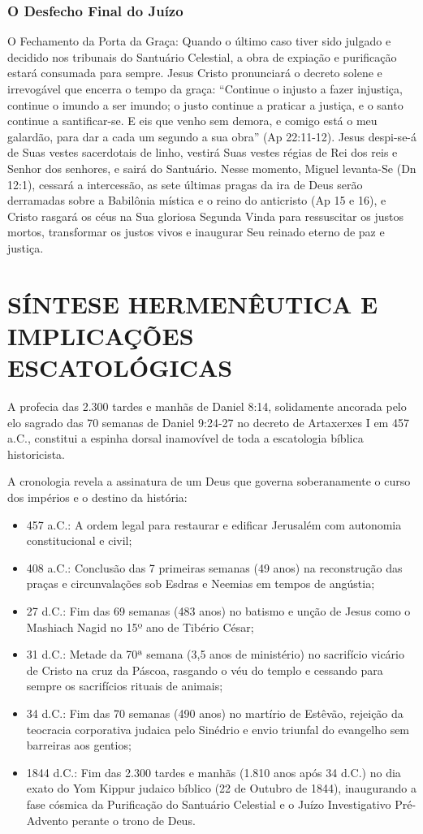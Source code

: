 \documentclass[11pt,a4paper,openany]{book}
\begin{document}
\subsubsection*{O Desfecho Final do Juízo}
O Fechamento da Porta da Graça:
Quando o último caso tiver sido julgado e decidido nos tribunais do Santuário Celestial, a obra de expiação e purificação estará consumada para sempre. Jesus Cristo pronunciará o decreto solene e irrevogável que encerra o tempo da graça:
``Continue o injusto a fazer injustiça, continue o imundo a ser imundo; o justo continue a praticar a justiça, e o santo continue a santificar-se. E eis que venho sem demora, e comigo está o meu galardão, para dar a cada um segundo a sua obra'' (Ap 22:11-12).
Jesus despi-se-á de Suas vestes sacerdotais de linho, vestirá Suas vestes régias de Rei dos reis e Senhor dos senhores, e sairá do Santuário. Nesse momento, Miguel levanta-Se (Dn 12:1), cessará a intercessão, as sete últimas pragas da ira de Deus serão derramadas sobre a Babilônia mística e o reino do anticristo (Ap 15 e 16), e Cristo rasgará os céus na Sua gloriosa Segunda Vinda para ressuscitar os justos mortos, transformar os justos vivos e inaugurar Seu reinado eterno de paz e justiça.



\section{SÍNTESE HERMENÊUTICA E IMPLICAÇÕES ESCATOLÓGICAS}


A profecia das 2.300 tardes e manhãs de Daniel 8:14, solidamente ancorada pelo elo sagrado das 70 semanas de Daniel 9:24-27 no decreto de Artaxerxes I em 457 a.C., constitui a espinha dorsal inamovível de toda a escatologia bíblica historicista.

A cronologia revela a assinatura de um Deus que governa soberanamente o curso dos impérios e o destino da história:
\begin{itemize}
  \item 457 a.C.: A ordem legal para restaurar e edificar Jerusalém com autonomia constitucional e civil;
  \item 408 a.C.: Conclusão das 7 primeiras semanas (49 anos) na reconstrução das praças e circunvalações sob Esdras e Neemias em tempos de angústia;
  \item 27 d.C.: Fim das 69 semanas (483 anos) no batismo e unção de Jesus como o Mashiach Nagid no 15º ano de Tibério César;
  \item 31 d.C.: Metade da 70ª semana (3,5 anos de ministério) no sacrifício vicário de Cristo na cruz da Páscoa, rasgando o véu do templo e cessando para sempre os sacrifícios rituais de animais;
  \item 34 d.C.: Fim das 70 semanas (490 anos) no martírio de Estêvão, rejeição da teocracia corporativa judaica pelo Sinédrio e envio triunfal do evangelho sem barreiras aos gentios;
  \item 1844 d.C.: Fim das 2.300 tardes e manhãs (1.810 anos após 34 d.C.) no dia exato do Yom Kippur judaico bíblico (22 de Outubro de 1844), inaugurando a fase cósmica da Purificação do Santuário Celestial e o Juízo Investigativo Pré-Advento perante o trono de Deus.
\end{itemize}
\end{document}
